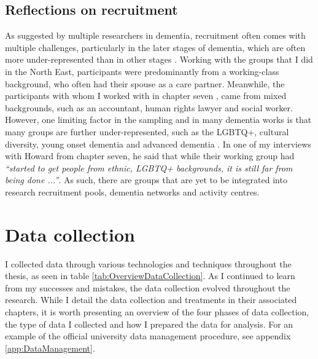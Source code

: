 \subsection{Reflections on recruitment}
As suggested by multiple researchers in dementia, recruitment often comes with multiple challenges, particularly in the later stages of dementia, which are often more under-represented than in other stages \citep{bartlett2019strategies}. Working with the groups that I did in the North East, participants were predominantly from a working-class background, who often had their spouse as a care partner. Meanwhile, the participants with whom I worked with in chapter seven , came from mixed backgrounds, such as an accountant, human rights lawyer and social worker. 
However, one limiting factor in the sampling and in many dementia works is that many groups are further under-represented, such as the LGBTQ+, cultural diversity, young onset dementia and advanced dementia \citep{mcgovern2014forgotten}. In one of my interviews with Howard from chapter seven, he said that while their working group had \textit{``started to get people from ethnic, LGBTQ+ backgrounds, it is still far from being done ...''}. As such, there are groups that are yet to be integrated into research recruitment pools, dementia networks and activity centres. 

\section{Data collection}
\label{Method:DataCollection}
I collected data through various technologies and techniques throughout the thesis, as seen in table \ref{tab:OverviewDataCollection}. As I continued to learn from my successes and mistakes, the data collection evolved throughout the research. While I detail the data collection and treatments in their associated chapters, it is worth presenting an overview of the four phases of data collection, the type of data I collected and how I prepared the data for analysis. For an example of the official university data management procedure, see appendix \ref{app:DataManagement}.

